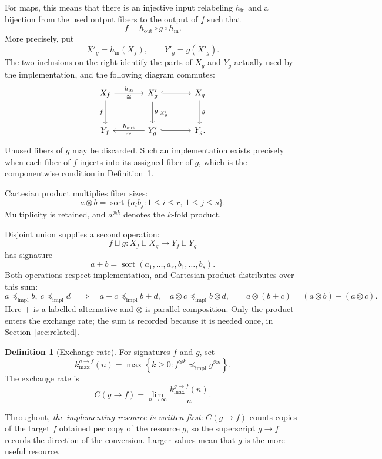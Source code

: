 \documentclass[11pt]{article}
\theoremstyle{definition}
\newtheorem{definition}{Definition}
\theoremstyle{remark}
\newcommand{\impl}{\preccurlyeq_{\mathrm{impl}}}
\begin{document}
For maps, this means that there is an injective input relabeling
\(h_{\mathrm{in}}\) and a bijection from the used output fibers to the output
of \(f\) such that
\[
  f=h_{\mathrm{out}}\circ g\circ h_{\mathrm{in}}.
\]
More precisely, put
\[
  X'_g=h_{\mathrm{in}}(X_f),
  \qquad
  Y'_g=g(X'_g).
\]
The two inclusions on the right identify the parts of \(X_g\) and \(Y_g\)
actually used by the implementation, and the following diagram commutes:
\[
\begin{tikzcd}[column sep=large,row sep=large]
  X_f
    \arrow[r,"h_{\mathrm{in}}","\cong"']
    \arrow[d,"f"']
  & X'_g
    \arrow[r,hook]
    \arrow[d,"g|_{X'_g}"]
  & X_g
    \arrow[d,"g"]
  \\
  Y_f
  & Y'_g
    \arrow[l,"h_{\mathrm{out}}"',"\cong"]
    \arrow[r,hook]
  & Y_g .
\end{tikzcd}
\]
Unused fibers of \(g\) may be discarded.  Such an implementation exists
precisely when each fiber of \(f\) injects into its assigned fiber of \(g\),
which is the componentwise condition in Definition~1.

Cartesian product multiplies fiber sizes:
\[
  a\otimes b
  =\operatorname{sort}\{a_i b_j:1\leq i\leq r,\ 1\leq j\leq s\}.
\]
Multiplicity is retained, and \(a^{\otimes k}\) denotes the \(k\)-fold
product.

Disjoint union supplies a second operation:
\[
  f\sqcup g:X_f\sqcup X_g\longrightarrow Y_f\sqcup Y_g
\]
has signature
\[
  a+b=\operatorname{sort}(a_1,\ldots,a_r,b_1,\ldots,b_s).
\]
Both operations respect implementation, and Cartesian product distributes
over this sum:
\[
  a\impl b,\ c\impl d
  \quad\Longrightarrow\quad
  a+c\impl b+d,\quad a\otimes c\impl b\otimes d,
  \qquad
  a\otimes(b+c)=(a\otimes b)+(a\otimes c).
\]
Here \(+\) is a labelled alternative and \(\otimes\) is parallel composition.
Only the product enters the exchange rate; the sum is recorded because it is
needed once, in Section~\ref{sec:related}.

\begin{definition}[Exchange rate]
For signatures \(f\) and \(g\), set
\[
 k_{\max}^{g\to f}(n)
 =\max\left\{k\geq0:f^{\otimes k}\impl g^{\otimes n}\right\}.
\]
The exchange rate is
\[
  C(g\to f)
  =\lim_{n\to\infty}\frac{k_{\max}^{g\to f}(n)}{n}.
\]
\end{definition}

Throughout, \emph{the implementing resource is written first}: \(C(g\to f)\)
counts copies of the target \(f\) obtained per copy of the resource \(g\), so
the superscript \(g\to f\) records the direction of the conversion.  Larger
values mean that \(g\) is the more useful resource.
\end{document}
